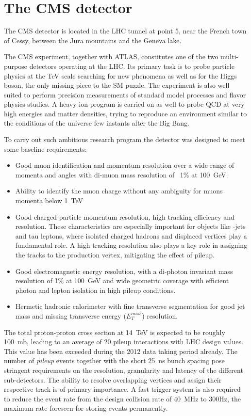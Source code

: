 \section{The CMS detector}

The CMS detector is located in the LHC tunnel at point 5, near the French town of Cessy, between the Jura mountains and the Geneva lake.
 
The CMS experiment, together with ATLAS, constitutes one of the two multi-purpose detectors operating at the LHC. Its primary task is to probe particle physics at the TeV scale searching for new phenomena as well as for the Higgs boson, the only missing piece to the SM puzzle. The experiment is also well suited to perform precision measurements of standard model processes and flavor physics studies. A heavy-ion program is carried on as well to probe QCD at very high energies and matter densities, trying to reproduce an environment similar to the conditions of the universe few instants after the Big Bang.

To carry out such ambitious research program the detector was designed to meet some baseline requirements:
\begin{itemize}
\item Good muon identification and momentum resolution over a wide range of momenta and angles with di-muon mass resolution of ~1\% at 100~GeV.
\item Ability to identify the muon charge without any ambiguity for muons momenta below 1~TeV
\item Good charged-particle momentum resolution, high tracking efficiency and resolution. These characteristics are especially important for objects like \b-jets and tau leptons, where isolated charged hadrons and displaced vertices play a fundamental role. A high tracking resolution also plays a key role in assigning the tracks to the production vertex, mitigating the effect of pileup.
\item Good electromagnetic energy resolution, with a di-photon invariant mass resolution of \~1\% at 100~GeV and wide geometric coverage with efficient photon and lepton isolation in high pileup conditions.
\item Hermetic hadronic calorimeter with fine transverse segmentation for good jet mass and missing transverse energy ($E_T^{miss}$) resolution. 
\end{itemize}

The total proton-proton cross section at 14~TeV is expected to be roughly 100~mb, leading to an average of 20 pileup interactions with LHC design values. This value has been exceeded during the 2012 data taking period already. The number of \emph{pileup} events together with the short 25~ns bunch spacing pose stringent requirements on the resolution, granularity and latency of the different sub-detectors. The ability to resolve overlapping vertices and assign their respective track is of primary importance. A fast trigger system is also required to reduce the event rate from the design collision rate of 40~MHz to 300Hz, the maximum rate foreseen for storing events permanently.

